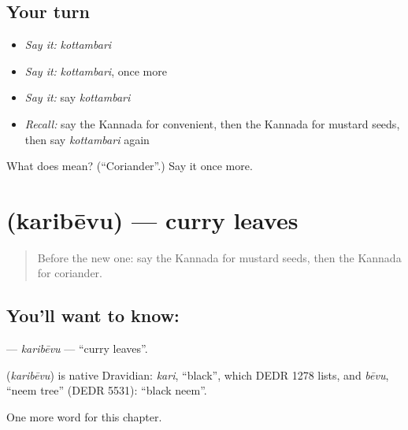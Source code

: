 \subsection*{Your turn}
\begin{itemize}
\raggedright
  \item \emph{Say it:} \emph{kottambari}
  \item \emph{Say it:} \emph{kottambari}, once more
  \item \emph{Say it:} say \emph{kottambari}
  \item \emph{Recall:} say the Kannada for convenient, then the Kannada for mustard seeds, then say \emph{kottambari} again
\end{itemize}

\begin{tcolorbox}[breakable,colback=teal!4,colframe=teal!35!black,title={Before you move on}]
What does  mean? (\textquotedblleft{}Coriander\textquotedblright{}.) Say it once more.
\end{tcolorbox}
\section[\texorpdfstring{\kn{ಕರಿಬೇವು} (karibēvu)}{ಕರಿಬೇವು (karibēvu)}]{ (karibēvu) — curry leaves}

\label{lesson:KA-C293-karibevu}



\begin{quote}
Before the new one: say the Kannada for mustard seeds, then the Kannada for coriander.
\end{quote}

\subsection*{You'll want to know: }
\textbf{} — \emph{karibēvu} — \textquotedblleft{}curry leaves\textquotedblright{}.

\begin{cousinweb}
\textbf{} (\emph{karibēvu}) is native Dravidian: \emph{kari}, \textquotedblleft{}black\textquotedblright{}, which DEDR 1278 lists, and \emph{bēvu}, \textquotedblleft{}neem tree\textquotedblright{} (DEDR 5531): \textquotedblleft{}black neem\textquotedblright{}.
\end{cousinweb}

\begin{grammarlens}[title={What you've built}]
One more word for this chapter.
\end{grammarlens}

